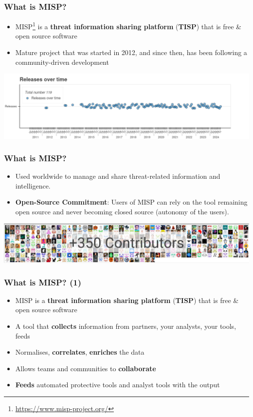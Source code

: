 \begin{frame}
    \frametitle{What is MISP?}
    \begin{itemize}
        \item MISP\footnote{\url{https://www.misp-project.org/}} is a {\bf threat information sharing platform} ({\bf TISP}) that is free \& open source software
        \item Mature project that was started in 2012, and since then, has been following a community-driven development
    \end{itemize}

    \begin{center}
        \includegraphics[width=0.99\linewidth]{release_overtime.png}
    \end{center}
\end{frame}

\begin{frame}
    \frametitle{What is MISP?}
    \begin{itemize}
        \item Used worldwide to manage and share threat-related information and intelligence.
	\item \textbf{Open-Source Commitment}: Users of MISP can rely on the tool remaining open source and never becoming closed source (autonomy of the users).
    \end{itemize}

    \begin{center}
        \includegraphics[width=0.99\linewidth]{contributors.png}
    \end{center}
\end{frame}


\begin{frame}
    \frametitle{What is MISP? (1)}
    \begin{itemize}
        \item MISP is a {\bf threat information sharing platform} ({\bf TISP}) that is free \& open source software
        \item A tool that {\bf collects} information from partners, your analysts, your tools, feeds
        \item Normalises, {\bf correlates}, {\bf enriches} the data
        \item Allows teams and communities to {\bf collaborate}
        \item {\bf Feeds} automated protective tools and analyst tools with the output
    \end{itemize}
\end{frame}

